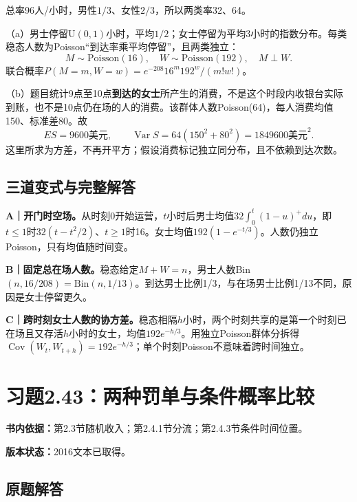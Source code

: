 \documentclass[
  11pt,
  a4paper,
  UTF8,fontset=fandol]{ctexart}
\let\OldSection\section
\renewcommand{\section}{\Needspace{7\baselineskip}\OldSection}
\let\OldSubsection\subsection
\renewcommand{\subsection}{\Needspace{5\baselineskip}\OldSubsection}
\begin{document}
总率96人/小时，男性\(1/3\)、女性\(2/3\)，所以两类率32、64。

（a）男士停留U\((0,1)\)小时，平均\(1/2\)；女士停留为平均3小时的指数分布。每类稳态人数为Poisson``到达率乘平均停留''，且两类独立：
\[\boxed{M\sim\mathrm{Poisson}(16),\quad W\sim\mathrm{Poisson}(192),\quad M\perp W.}\]
联合概率\(P(M=m,W=w)=e^{-208}16^m192^w/(m!w!)\)。

（b）题目统计9点至10点\textbf{到达的女士}所产生的消费，不是这个时段内收银台实际到账，也不是10点仍在场的人的消费。该群体人数Poisson(64)，每人消费均值150、标准差80。故
\[\boxed{ES=9600\text{美元}},\qquad\boxed{\operatorname{Var}S=64(150^2+80^2)=1849600\text{美元}^2.}\]
这里所求为方差，不再开平方；假设消费标记独立同分布，且不依赖到达次数。

\subsection{三道变式与完整解答}\label{ux4e09ux9053ux53d8ux5f0fux4e0eux5b8cux6574ux89e3ux7b54-41}

\textbf{A｜开门时空场。}从时刻0开始运营，\(t\)小时后男士均值\(32\int_0^t(1-u)^+du\)，即\(t\le1\)时\(32(t-t^2/2)\)、\(t\ge1\)时16。女士均值\(192(1-e^{-t/3})\)。人数仍独立Poisson，只有均值随时间变。

\textbf{B｜固定总在场人数。}稳态给定\(M+W=n\)，男士人数Bin\((n,16/208)=\mathrm{Bin}(n,1/13)\)。到达男士比例1/3，与在场男士比例1/13不同，原因是女士停留更久。

\textbf{C｜跨时刻女士人数的协方差。}稳态相隔\(h\)小时，两个时刻共享的是第一个时刻已在场且又存活\(h\)小时的女士，均值\(192e^{-h/3}\)。用独立Poisson群体分拆得\(\operatorname{Cov}(W_t,W_{t+h})=192e^{-h/3}\)；单个时刻Poisson不意味着跨时间独立。

\newpage

\section{习题2.43：两种罚单与条件概率比较}\label{ux4e60ux98982.43ux4e24ux79cdux7f5aux5355ux4e0eux6761ux4ef6ux6982ux7387ux6bd4ux8f83}

\textbf{书内依据：}第2.3节随机收入；第2.4.1节分流；第2.4.3节条件时间位置。

\textbf{版本状态：}2016文本已取得。

\subsection{原题解答}\label{ux539fux9898ux89e3ux7b54-42}
\end{document}
